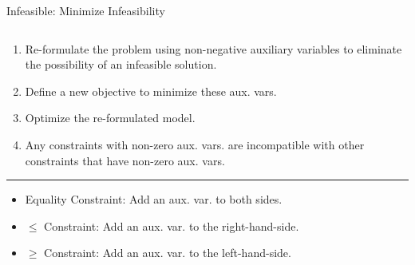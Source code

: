 \documentclass[10pt, aspectratio=169]{beamer}
\begin{document}
\begin{frame}{Infeasible: Minimize Infeasibility}
    \begin{columns}
        \begin{column}{0.5\textwidth}
            \begin{enumerate}
                \item Re-formulate the problem using non-negative auxiliary variables to eliminate the possibility of an infeasible solution.
                \item Define a new objective to minimize these aux. vars.
                \item Optimize the re-formulated model.
                \item Any constraints with non-zero aux. vars. are incompatible with other constraints that have non-zero aux. vars.
            \end{enumerate}
            \hrule
            \vspace{0.1cm}
            \begin{itemize}
                \item Equality Constraint: Add an aux. var. to both sides.
                \item $\leq$ Constraint: Add an aux. var. to the right-hand-side.
                \item $\geq$ Constraint: Add an aux. var. to the left-hand-side.
            \end{itemize}
        \end{column}
    \end{columns}
\end{frame}
\end{document}
